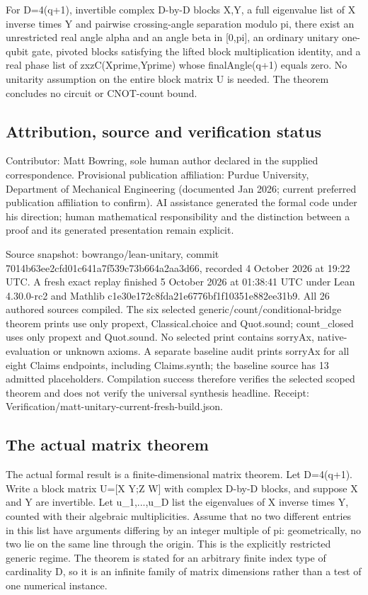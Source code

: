 \documentclass[11pt,a4paper]{article}
\begin{document}
For D=4(q+1), invertible complex D-by-D blocks X,Y, a full eigenvalue list of X inverse times Y and pairwise crossing-angle separation modulo pi, there exist an unrestricted real angle alpha and an angle beta in [0,pi], an ordinary unitary one-qubit gate, pivoted blocks satisfying the lifted block multiplication identity, and a real phase list of zxzC(Xprime,Yprime) whose finalAngle(q+1) equals zero. No unitarity assumption on the entire block matrix U is needed. The theorem concludes no circuit or CNOT-count bound.

\subsection{Attribution, source and verification status}
Contributor: Matt Bowring, sole human author declared in the supplied correspondence. Provisional publication affiliation: Purdue University, Department of Mechanical Engineering (documented Jan 2026; current preferred publication affiliation to confirm). AI assistance generated the formal code under his direction; human mathematical responsibility and the distinction between a proof and its generated presentation remain explicit.

\begin{samepage}
Source snapshot: bowrango/lean-unitary, commit 7014b63ee2cfd01c641a7f539c73b664a2aa3d66, recorded 4 October 2026 at 19:22 UTC. A fresh exact replay finished 5 October 2026 at 01:38:41 UTC under Lean 4.30.0-rc2 and Mathlib c1e30e172c8fda21e6776bf1f10351e882ee31b9. All 26 authored sources compiled. The six selected generic/count/conditional-bridge theorem prints use only propext, Classical.choice and Quot.sound; count\_closed uses only propext and Quot.sound. No selected print contains sorryAx, native-evaluation or unknown axioms. A separate baseline audit prints sorryAx for all eight Claims endpoints, including Claims.synth; the baseline source has 13 admitted placeholders. Compilation success therefore verifies the selected scoped theorem and does not verify the universal synthesis headline. Receipt: Verification/matt-unitary-current-fresh-build.json.

\end{samepage}
\subsection{The actual matrix theorem}
The actual formal result is a finite-dimensional matrix theorem. Let D=4(q+1). Write a block matrix U=[X Y;Z W] with complex D-by-D blocks, and suppose X and Y are invertible. Let u\_1,...,u\_D list the eigenvalues of X inverse times Y, counted with their algebraic multiplicities. Assume that no two different entries in this list have arguments differing by an integer multiple of pi: geometrically, no two lie on the same line through the origin. This is the explicitly restricted generic regime. The theorem is stated for an arbitrary finite index type of cardinality D, so it is an infinite family of matrix dimensions rather than a test of one numerical instance.
\end{document}
